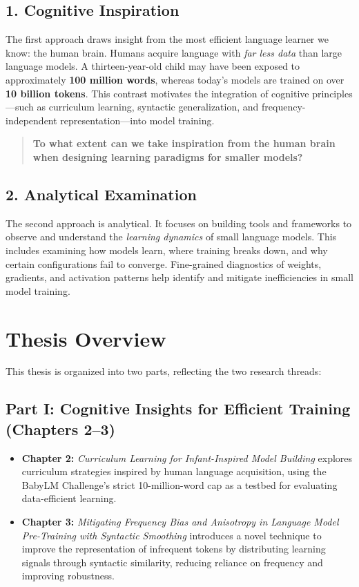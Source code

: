 \subsection*{1. Cognitive Inspiration}

The first approach draws insight from the most efficient language learner we know: the human brain. Humans acquire language with \emph{far less data} than large language models. A thirteen-year-old child may have been exposed to approximately \textbf{100 million words}, whereas today's models are trained on over \textbf{10 billion tokens}. This contrast motivates the integration of cognitive principles—such as curriculum learning, syntactic generalization, and frequency-independent representation—into model training.

\begin{quote}
\textbf{To what extent can we take inspiration from the human brain when designing learning paradigms for smaller models?} 
\end{quote}

\subsection*{2. Analytical Examination}

The second approach is analytical. It focuses on building tools and frameworks to observe and understand the \emph{learning dynamics} of small language models. This includes examining how models learn, where training breaks down, and why certain configurations fail to converge. Fine-grained diagnostics of weights, gradients, and activation patterns help identify and mitigate inefficiencies in small model training.

\section*{Thesis Overview}

This thesis is organized into two parts, reflecting the two research threads:

\subsection*{Part I: Cognitive Insights for Efficient Training (Chapters 2–3)}

\begin{itemize}
    \item \textbf{Chapter 2:} \emph{Curriculum Learning for Infant-Inspired Model Building}  
    explores curriculum strategies inspired by human language acquisition, using the BabyLM Challenge's strict 10-million-word cap as a testbed for evaluating data-efficient learning.

    \item \textbf{Chapter 3:} \emph{Mitigating Frequency Bias and Anisotropy in Language Model Pre-Training with Syntactic Smoothing}  
    introduces a novel technique to improve the representation of infrequent tokens by distributing learning signals through syntactic similarity, reducing reliance on frequency and improving robustness.
\end{itemize}

